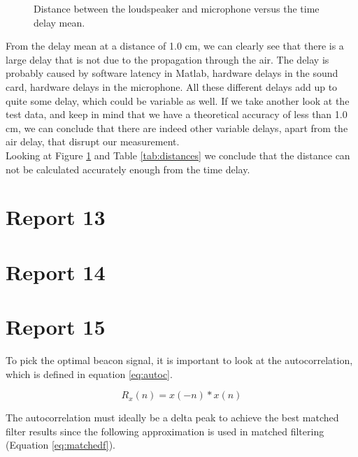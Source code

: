 \documentclass[final]{scrreprt} %
\begin{document}
\begin{figure}[H]
\centering
{}
\caption{Distance between the loudspeaker and microphone versus the time delay mean.}
\label{fig:means}
\end{figure}

From the delay mean at a distance of 1.0 cm, we can clearly see that there is a large delay that is not due to the propagation through the air.
The delay is probably caused by software latency in Matlab, hardware delays in the sound card, hardware delays in the microphone.
All these different delays add up to quite some delay, which could be variable as well.
If we take another look at the test data, and keep in mind that we have a theoretical accuracy of less than 1.0 cm, we can conclude that there are indeed other variable delays, apart from the air delay, that disrupt our measurement.\\ 
Looking at Figure \ref{fig:means} and Table \ref{tab:distances} we conclude that the distance can not be calculated accurately enough from the time delay. 


\section{Report 13}

\section{Report 14}

\section{Report 15}
To pick the optimal beacon signal, it is important to look at the autocorrelation, which is defined in equation \ref{eq:autoc}.

\begin{equation}
	R_x(n) = x(-n) * x(n)
	\label{eq:autoc}
\end{equation}

The autocorrelation must ideally be a delta peak to achieve the best matched filter results since the following approximation is used in matched filtering (Equation \ref{eq:matchedf}).
\end{document}
